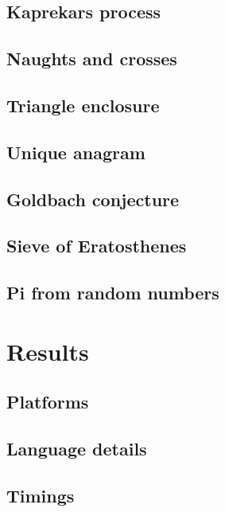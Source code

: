 \documentclass[a4paper,11pt]{article}
\begin{document}
\subsection{Kaprekars process}
\subsection{Naughts and crosses}
\subsection{Triangle enclosure}
\subsection{Unique anagram}
\subsection{Goldbach conjecture}
\subsection{Sieve of Eratosthenes}
\subsection{Pi from random numbers}

\section{Results}

\subsection{Platforms}



\subsection{Language details}



\subsection{Timings}
\end{document}
